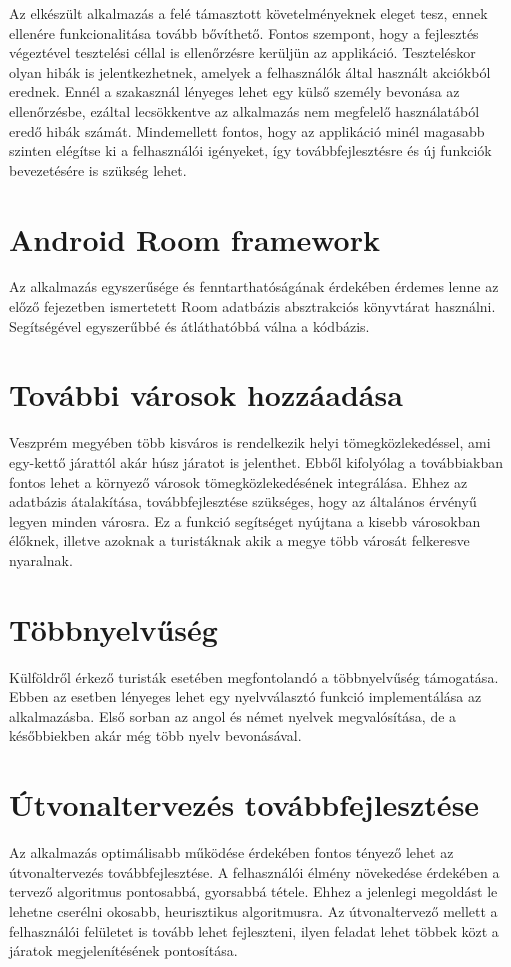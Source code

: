 
Az elkészült alkalmazás a felé támasztott követelményeknek eleget tesz, ennek ellenére funkcionalitása tovább bővíthető.
Fontos szempont, hogy a fejlesztés végeztével tesztelési céllal is ellenőrzésre kerüljün az applikáció.
Teszteléskor olyan hibák is jelentkezhetnek, amelyek a felhasználók által használt akciókból erednek.
Ennél a szakasznál lényeges lehet egy külső személy bevonása az ellenőrzésbe, ezáltal lecsökkentve az alkalmazás nem megfelelő használatából eredő hibák számát.
Mindemellett fontos, hogy az applikáció minél magasabb szinten elégítse ki a felhasználói igényeket, így továbbfejlesztésre és új funkciók bevezetésére is szükség lehet.

\section*{Android Room framework}
\label{androidroom}
Az alkalmazás egyszerűsége és fenntarthatóságának érdekében érdemes lenne az előző fejezetben ismertetett Room adatbázis absztrakciós könyvtárat használni.
Segítségével egyszerűbbé és átláthatóbbá válna a kódbázis.

\section*{További városok hozzáadása}
\label{morecity}
Veszprém megyében több kisváros is rendelkezik helyi tömegközlekedéssel, ami egy-kettő járattól akár húsz járatot is jelenthet.
Ebből kifolyólag a továbbiakban fontos lehet a környező városok tömegközlekedésének integrálása.
Ehhez az adatbázis átalakítása, továbbfejlesztése szükséges, hogy az általános érvényű legyen minden városra.
Ez a funkció segítséget nyújtana a kisebb városokban élőknek, illetve azoknak a turistáknak akik a megye több városát felkeresve nyaralnak.

\section*{Többnyelvűség}
\label{internationalization}
Külföldről érkező turisták esetében megfontolandó a többnyelvűség támogatása.
Ebben az esetben lényeges lehet egy nyelvválasztó funkció implementálása az alkalmazásba.
Első sorban az angol és német nyelvek megvalósítása, de a későbbiekben akár még több nyelv bevonásával.

\section*{Útvonaltervezés továbbfejlesztése}
\label{routeplan}
Az alkalmazás optimálisabb működése érdekében fontos tényező lehet az útvonaltervezés továbbfejlesztése.
A felhasználói élmény növekedése érdekében a tervező algoritmus pontosabbá, gyorsabbá tétele.
Ehhez a jelenlegi megoldást le lehetne cserélni okosabb, heurisztikus algoritmusra.
Az útvonaltervező mellett a felhasználói felületet is tovább lehet fejleszteni, ilyen feladat lehet többek közt a járatok megjelenítésének pontosítása. 

